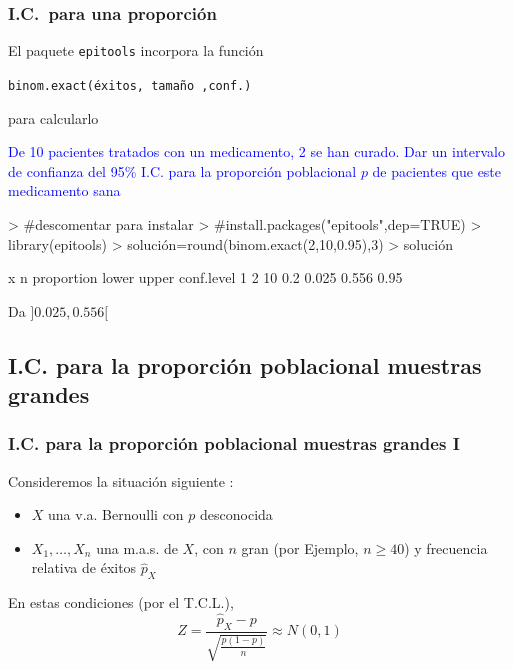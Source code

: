 \documentclass[12pt,t]{beamer}
\newcommand{\blue}[1]{\textcolor{blue}{#1}}
\renewcommand{\geq}{\geqslant}
\theoremstyle{plain}
\theoremstyle{definition}
\begin{document}

\begin{frame}[fragile]
\frametitle{I.C.\ para  una proporción}
\vspace*{-2ex}

El paquete \texttt{epitools} incorpora la función 
\begin{center}
{\tt binom.exact(éxitos, tamaño ,conf.)}
\end{center}
para calcularlo
\medskip

\blue{De 10 pacientes tratados con un medicamento, 2 se han curado. Dar un intervalo de confianza  del 95\% I.C. 
para  la proporción poblacional $p$ de pacientes que este medicamento sana}

\begin{Schunk}
\begin{Sinput}
> #descomentar para instalar
> #install.packages("epitools",dep=TRUE)
> library(epitools)
> solución=round(binom.exact(2,10,0.95),3)
> solución
\end{Sinput}
\begin{Soutput}
  x  n proportion lower upper conf.level
1 2 10        0.2 0.025 0.556       0.95
\end{Soutput}
\end{Schunk}

Da $]0.025,0.556[$
\end{frame}

\subsection{I.C. para la proporción poblacional muestras grandes}


\begin{frame}
\frametitle{I.C. para la proporción poblacional muestras grandes I}

Consideremos la situación siguiente  :
\begin{itemize}
\item  $X$ una v.a. Bernoulli con $p$ desconocida

\item $X_1,\ldots,X_n$ una m.a.s. de $X$, con $n$  gran (por Ejemplo, $n\geq 40$) y frecuencia relativa de éxitos $\widehat{p}_{X}$
\end{itemize}
\medskip

En estas  condiciones (por el  T.C.L.), 
$$
Z=\dfrac{\widehat{p}_{X}-p}
{\sqrt{\frac{p(1-p)}{n}}}\approx N(0,1)
$$
\end{frame}
\end{document}
